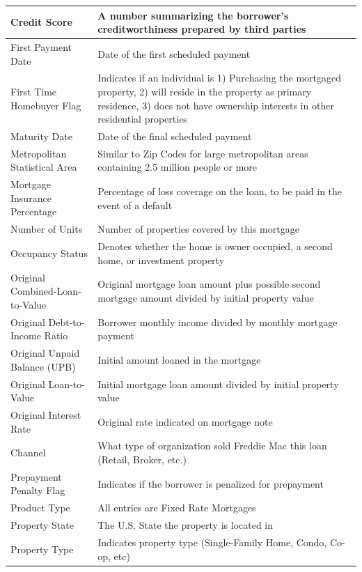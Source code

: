 \documentclass[12 pt]{uncw_thesis}
\theoremstyle{plain}
\theoremstyle{remark}
\theoremstyle{definition}
\begin{document}
\begin{center}
	\begin{longtable}{ |M{5.5cm}|M{8.75cm}| }
		\hline
		Credit Score & A number summarizing the borrower's creditworthiness prepared by third parties\\ \hline
		First Payment Date & Date of the first scheduled payment\\ \hline
		First Time Homebuyer Flag & Indicates if an individual is 1) Purchasing the mortgaged property, 2) will reside in the property as primary residence, 3) does not have ownership interests in other residential properties \\
		\hline
		Maturity Date & Date of the final scheduled payment\\
		\hline
		Metropolitan Statistical Area & Similar to Zip Codes for large metropolitan areas containing 2.5 million people or more\\
		\hline
		Mortgage Insurance Percentage & Percentage of loss coverage on the loan, to be paid in the event of a default\\
		\hline
		Number of Units & Number of properties covered by this mortgage\\
		\hline
		Occupancy Status & Denotes whether the home is owner occupied, a second home, or investment property\\
		\hline
		Original Combined-Loan-to-Value & Original mortgage loan amount plus possible second mortgage amount divided by initial property value\\ 
		\hline
		Original Debt-to-Income Ratio & Borrower monthly income divided by monthly mortgage payment \\
		\hline
		Original Unpaid Balance (UPB) & Initial amount loaned in the mortgage\\
		\hline
		Original Loan-to-Value & Initial mortgage loan amount divided by initial property value\\
		\hline
		Original Interest Rate & Original rate indicated on mortgage note\\
		\hline
		Channel & What type of organization sold Freddie Mac this loan (Retail, Broker, etc.)\\
		\hline
		Prepayment Penalty Flag & Indicates if the borrower is penalized for prepayment\\
		\hline
		Product Type & All entries are Fixed Rate Mortgages\\
		\hline
		Property State & The U.S. State the property is located in\\
		\hline
		Property Type & Indicates property type (Single-Family Home, Condo, Co-op, etc) \\

\end{longtable}
\end{center}
\end{document}
